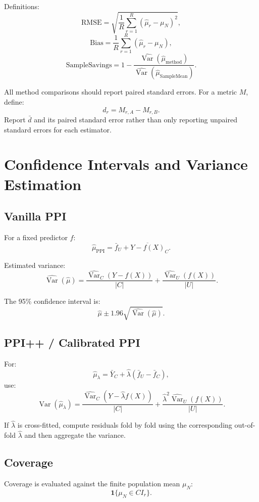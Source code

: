 \documentclass[11pt]{article}
\begin{document}
Definitions:
\[
\mathrm{RMSE}=\sqrt{\frac{1}{R}\sum_{r=1}^{R}(\hat\mu_r-\mu_N)^2},
\]
\[
\mathrm{Bias}=\frac{1}{R}\sum_{r=1}^{R}(\hat\mu_r-\mu_N),
\]
\[
\mathrm{SampleSavings}
=
1-
\frac{\widehat{\operatorname{Var}}(\hat\mu_{\mathrm{method}})}
{\widehat{\operatorname{Var}}(\hat\mu_{\mathrm{SampleMean}})}.
\]

All method comparisons should report paired standard errors. For a metric $M$, define:
\[
d_r=M_{r,A}-M_{r,B}.
\]
Report $\bar d$ and its paired standard error rather than only reporting unpaired standard errors for each estimator.

\section{Confidence Intervals and Variance Estimation}

\subsection{Vanilla PPI}

For a fixed predictor $f$:
\[
\hat\mu_{\mathrm{PPI}}=\bar f_U+\overline{Y-f(X)}_C.
\]

Estimated variance:
\[
\widehat{\operatorname{Var}}(\hat\mu)
=
\frac{\widehat{\operatorname{Var}}_C(Y-f(X))}{|C|}
+
\frac{\widehat{\operatorname{Var}}_U(f(X))}{|U|}.
\]

The 95\% confidence interval is:
\[
\hat\mu \pm 1.96\sqrt{\widehat{\operatorname{Var}}(\hat\mu)}.
\]

\subsection{PPI++ / Calibrated PPI}

For:
\[
\hat\mu_\lambda=\bar Y_C+\hat\lambda(\bar f_U-\bar f_C),
\]
use:
\[
\widehat{\operatorname{Var}}(\hat\mu_\lambda)
=
\frac{\widehat{\operatorname{Var}}_C(Y-\hat\lambda f(X))}{|C|}
+
\frac{\hat\lambda^2\widehat{\operatorname{Var}}_U(f(X))}{|U|}.
\]

If $\hat\lambda$ is cross-fitted, compute residuals fold by fold using the corresponding out-of-fold $\hat\lambda$ and then aggregate the variance.

\subsection{Coverage}

Coverage is evaluated against the finite population mean $\mu_N$:
\[
\mathbf{1}\{\mu_N\in CI_r\}.
\]
\end{document}
